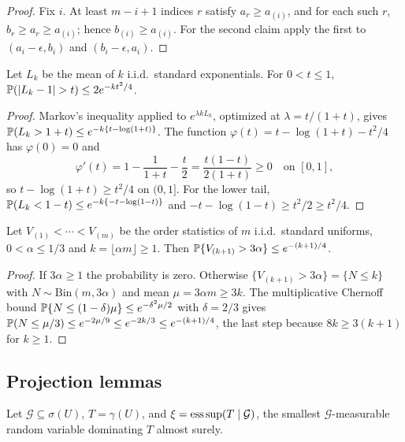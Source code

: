 \begin{proof}
Fix $i$.  At least $m-i+1$ indices $r$ satisfy $a_r\ge a_{(i)}$, and for
each such $r$, $b_r\ge a_r\ge a_{(i)}$; hence $b_{(i)}\ge a_{(i)}$.  For
the second claim apply the first to $(a_i-\epsilon,b_i)$ and
$(b_i-\epsilon,a_i)$.
\end{proof}

\begin{lemma}\label{lem:app-chernoff}
Let $L_k$ be the mean of $k$ i.i.d.\ standard exponentials.  For
$0<t\le1$,
$\Pp(|L_k-1|>t)\le2e^{-kt^2/4}$.
\end{lemma}

\begin{proof}
Markov's inequality applied to $e^{\lambda kL_k}$, optimized at
$\lambda=t/(1+t)$, gives
$\mathbb P(L_k>1+t)\le e^{-k\{t-\log(1+t)\}}$.  The function
$\varphi(t)=t-\log(1+t)-t^2/4$ has $\varphi(0)=0$ and
\[
 \varphi'(t)=1-\frac1{1+t}-\frac t2=\frac{t(1-t)}{2(1+t)}\ge0
 \quad\text{on }[0,1],
\]
so $t-\log(1+t)\ge t^2/4$ on $(0,1]$.  For the lower tail,
$\mathbb P(L_k<1-t)\le e^{-k\{-t-\log(1-t)\}}$ and
$-t-\log(1-t)\ge t^2/2\ge t^2/4$.
\end{proof}

\begin{lemma}\label{lem:app-threshold}
Let $V_{(1)}<\cdots<V_{(m)}$ be the order statistics of $m$ i.i.d.\
standard uniforms, $0<\alpha\le1/3$ and
$k=\lfloor\alpha m\rfloor\ge1$.  Then
$\mathbb P\{V_{(k+1)}>3\alpha\}\le e^{-(k+1)/4}$.
\end{lemma}

\begin{proof}
If $3\alpha\ge1$ the probability is zero.  Otherwise
$\{V_{(k+1)}>3\alpha\}=\{N\le k\}$ with
$N\sim\mathrm{Bin}(m,3\alpha)$ and mean $\mu=3\alpha m\ge3k$.  The
multiplicative Chernoff bound
$\mathbb P\{N\le(1-\delta)\mu\}\le e^{-\delta^2\mu/2}$
\citep[Section~2.2]{boucheronLugosiMassart2013} with $\delta=2/3$ gives
$\mathbb P(N\le\mu/3)\le e^{-2\mu/9}\le e^{-2k/3}\le e^{-(k+1)/4}$, the last
step because $8k\ge3(k+1)$ for $k\ge1$.
\end{proof}

\subsection{Projection lemmas}\label{app:projlem}

Let $\mathcal G\subseteq\sigma(U)$, $T=\gamma(U)$, and
$\xi=\operatorname*{ess\,sup}(T\mid\mathcal G)$, the smallest $\mathcal G$-measurable random
variable dominating $T$ almost surely.

